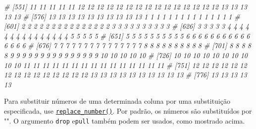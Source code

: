 \documentclass[
]{book}
\newenvironment{Shaded}{\begin{snugshade}}{\end{snugshade}}
\newcommand{\CommentTok}[1]{\textcolor[rgb]{0.56,0.35,0.01}{\textit{#1}}}
\begin{document}
\begin{Shaded}
\begin{Highlighting}[]
\CommentTok{# [551] 11 11 11 11 11 12 12 12 12 12 12 12 12 12 12 12 12 12 12 12 13 13 13 13 13}
\CommentTok{# [576] 13 13 13 13 13 13 13 13 13 13  1  1  1  1  1  1  1  1  1  1  1  1  1  1  1}
\CommentTok{# [601]  2  2  2  2  2  2  2  2  2  2  2  2  2  2  2  3  3  3  3  3  3  3  3  3  3}
\CommentTok{# [626]  3  3  3  3  3  4  4  4  4  4  4  4  4  4  4  4  4  4  4  4  5  5  5  5  5}
\CommentTok{# [651]  5  5  5  5  5  5  5  5  5  5  6  6  6  6  6  6  6  6  6  6  6  6  6  6  6}
\CommentTok{# [676]  7  7  7  7  7  7  7  7  7  7  7  7  7  7  7  8  8  8  8  8  8  8  8  8  8}
\CommentTok{# [701]  8  8  8  8  8  9  9  9  9  9  9  9  9  9  9  9  9  9  9  9 10 10 10 10 10}
\CommentTok{# [726] 10 10 10 10 10 10 10 10 10 10 11 11 11 11 11 11 11 11 11 11 11 11 11 11 11}
\CommentTok{# [751] 12 12 12 12 12 12 12 12 12 12 12 12 12 12 12 13 13 13 13 13 13 13 13 13 13}
\CommentTok{# [776] 13 13 13 13 13}
\end{Highlighting}
\end{Shaded}


Para substituir números de uma determinada coluna por uma substituição especificada, use \href{https://tiagoolivoto.github.io/metan/reference/utils_num_str.html}{\texttt{replace\_number()}}. Por padrão, os números são substituídos por "". O argumento \texttt{drop} e\texttt{pull} também podem ser usados, como mostrado acima.
\end{document}
